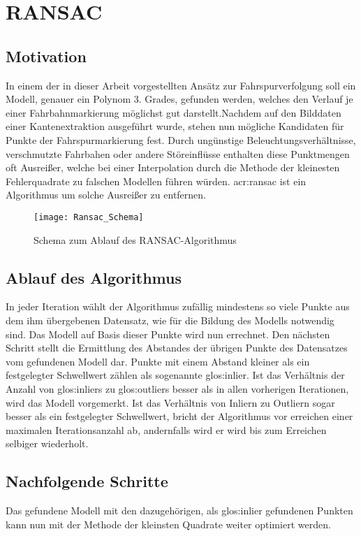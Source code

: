 \section{RANSAC}
\subsection{Motivation}
In einem der in dieser Arbeit vorgestellten Ansätz zur Fahrspurverfolgung soll ein Modell, genauer ein Polynom 3. Grades, gefunden werden, welches den Verlauf je einer Fahrbahnmarkierung möglichst gut darstellt.Nachdem auf den Bilddaten einer Kantenextraktion ausgeführt wurde, stehen nun mögliche Kandidaten für Punkte der Fahrspurmarkierung fest. Durch ungünstige Beleuchtungsverhältnisse, verschmutzte Fahrbahen oder andere Störeinflüsse enthalten diese Punktmengen oft Ausreißer, welche bei einer Interpolation durch die Methode der kleinesten Fehlerquadrate zu falschen Modellen führen würden. \gls{acr:ransac} \autocite{fischler1981random} ist ein Algorithmus um solche Ausreißer zu entfernen.

\begin{figure}[H]
  \centering
  \texttt{[image: Ransac\_Schema]}
  \caption{Schema zum Ablauf des RANSAC-Algorithmus}
  \label{fig:ransac_scheme}
\end{figure}

\subsection{Ablauf des Algorithmus}
In jeder Iteration wählt der Algorithmus zufällig mindestens so viele Punkte aus dem ihm übergebenen Datensatz, wie für die Bildung des Modells notwendig sind. Das Modell auf Basis dieser Punkte wird nun errechnet. Den nächsten Schritt stellt die Ermittlung des Abstandes der übrigen Punkte des Datensatzes vom gefundenen Modell dar. Punkte mit einem Abstand kleiner als ein festgelegter Schwellwert zählen als sogenannte \gls{glos:inlier}. Ist das Verhältnis der Anzahl von \glspl{glos:inlier} zu \glspl{glos:outlier} besser als in allen vorherigen Iterationen, wird das Modell vorgemerkt. Ist das Verhältnis von Inliern zu Outliern sogar besser als ein festgelegter Schwellwert, bricht der Algorithmus vor erreichen einer maximalen Iterationsanzahl ab, andernfalls wird er wird bis zum Erreichen selbiger wiederholt.

\subsection{Nachfolgende Schritte}
Das gefundene Modell mit den dazugehörigen, als \gls{glos:inlier} gefundenen Punkten kann nun mit der Methode der kleinsten Quadrate weiter optimiert werden.




